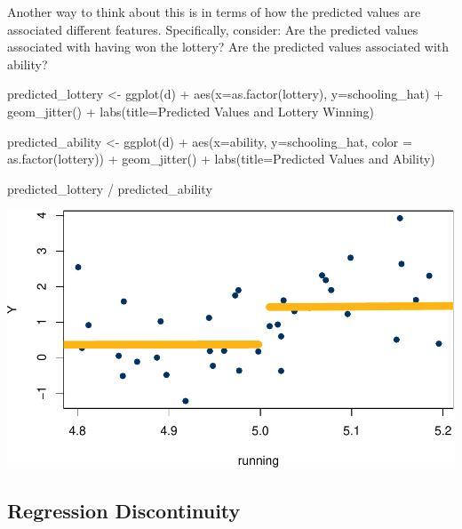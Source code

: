 \documentclass[
]{article}
\newenvironment{Shaded}{\begin{snugshade}}{\end{snugshade}}
\newcommand{\AttributeTok}[1]{\textcolor[rgb]{0.77,0.63,0.00}{#1}}
\newcommand{\FunctionTok}[1]{\textcolor[rgb]{0.00,0.00,0.00}{#1}}
\newcommand{\NormalTok}[1]{#1}
\newcommand{\OtherTok}[1]{\textcolor[rgb]{0.56,0.35,0.01}{#1}}
\newcommand{\SpecialCharTok}[1]{\textcolor[rgb]{0.00,0.00,0.00}{#1}}
\newcommand{\StringTok}[1]{\textcolor[rgb]{0.31,0.60,0.02}{#1}}
\begin{document}
Another way to think about this is in terms of how the predicted values are associated different features. Specifically, consider: Are the predicted values associated with having won the lottery? Are the predicted values associated with ability?

\begin{Shaded}
\begin{Highlighting}[]
\NormalTok{predicted\_lottery }\OtherTok{\textless{}{-}} \FunctionTok{ggplot}\NormalTok{(d) }\SpecialCharTok{+} 
  \FunctionTok{aes}\NormalTok{(}\AttributeTok{x=}\FunctionTok{as.factor}\NormalTok{(lottery), }\AttributeTok{y=}\NormalTok{schooling\_hat) }\SpecialCharTok{+} 
  \FunctionTok{geom\_jitter}\NormalTok{() }\SpecialCharTok{+} 
  \FunctionTok{labs}\NormalTok{(}\AttributeTok{title=}\StringTok{\textquotesingle{}Predicted Values and Lottery Winning\textquotesingle{}}\NormalTok{) }

\NormalTok{predicted\_ability }\OtherTok{\textless{}{-}} \FunctionTok{ggplot}\NormalTok{(d) }\SpecialCharTok{+} 
  \FunctionTok{aes}\NormalTok{(}\AttributeTok{x=}\NormalTok{ability, }\AttributeTok{y=}\NormalTok{schooling\_hat, }\AttributeTok{color =} \FunctionTok{as.factor}\NormalTok{(lottery)) }\SpecialCharTok{+} 
  \FunctionTok{geom\_jitter}\NormalTok{() }\SpecialCharTok{+} 
  \FunctionTok{labs}\NormalTok{(}\AttributeTok{title=}\StringTok{\textquotesingle{}Predicted Values and Ability\textquotesingle{}}\NormalTok{)}

\NormalTok{predicted\_lottery }\SpecialCharTok{/}\NormalTok{ predicted\_ability}
\end{Highlighting}
\end{Shaded}

\includegraphics{241-live-session_files/figure-latex/unnamed-chunk-22-1.pdf}

\hypertarget{regression-discontinuity}{%
\subsection{Regression Discontinuity}\label{regression-discontinuity}}
\end{document}
